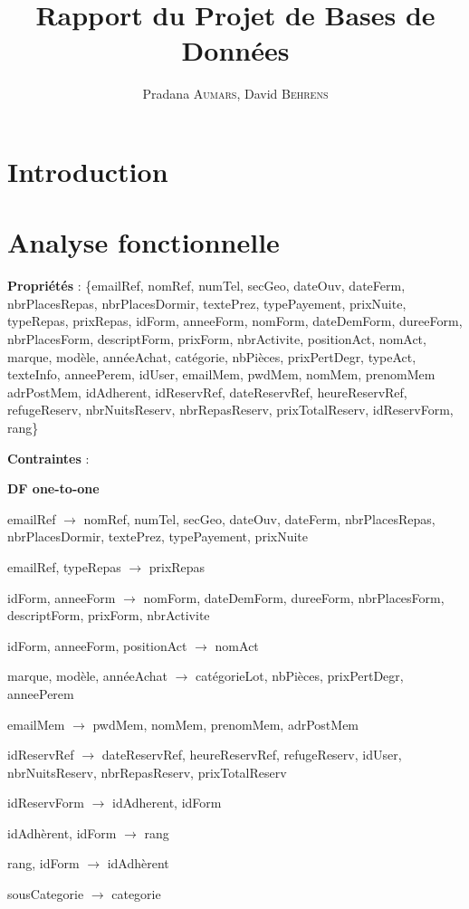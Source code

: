 \documentclass[12pt, a4paper]{article}
\title{Rapport du Projet de Bases de Données}
\author{Pradana \textsc{Aumars}, David \textsc{Behrens}}
\begin{document}
\maketitle
\section{Introduction}
\section{Analyse fonctionnelle}
\textbf{Propriétés} : \{emailRef, nomRef, numTel, secGeo, dateOuv, dateFerm, nbrPlacesRepas, nbrPlacesDormir, textePrez, typePayement, prixNuite, typeRepas, prixRepas, idForm, anneeForm, nomForm, dateDemForm, dureeForm, nbrPlacesForm, descriptForm, prixForm, nbrActivite, positionAct, nomAct, marque, modèle, annéeAchat, catégorie, nbPièces, prixPertDegr, typeAct, texteInfo, anneePerem, idUser, emailMem, pwdMem, nomMem, prenomMem adrPostMem, idAdherent, idReservRef, dateReservRef, heureReservRef, refugeReserv, nbrNuitsReserv, nbrRepasReserv, prixTotalReserv, idReservForm, rang\}

\textbf{Contraintes} :

\textbf{DF one-to-one}

emailRef $\rightarrow$ nomRef, numTel, secGeo, dateOuv, dateFerm, nbrPlacesRepas, nbrPlacesDormir, textePrez, typePayement, prixNuite

emailRef, typeRepas $\rightarrow$ prixRepas

idForm, anneeForm $\rightarrow$ nomForm, dateDemForm, dureeForm, nbrPlacesForm, descriptForm, prixForm, nbrActivite

idForm, anneeForm, positionAct $\rightarrow$ nomAct

marque, modèle, annéeAchat $\rightarrow$ catégorieLot, nbPièces, prixPertDegr, anneePerem

emailMem $\rightarrow$ pwdMem, nomMem, prenomMem, adrPostMem

idReservRef $\rightarrow$ dateReservRef, heureReservRef, refugeReserv, idUser, nbrNuitsReserv, nbrRepasReserv, prixTotalReserv

idReservForm $\rightarrow$ idAdherent, idForm

idAdhèrent, idForm $\rightarrow$ rang

rang, idForm $\rightarrow$ idAdhèrent

sousCategorie $\rightarrow$ categorie
\end{document}
